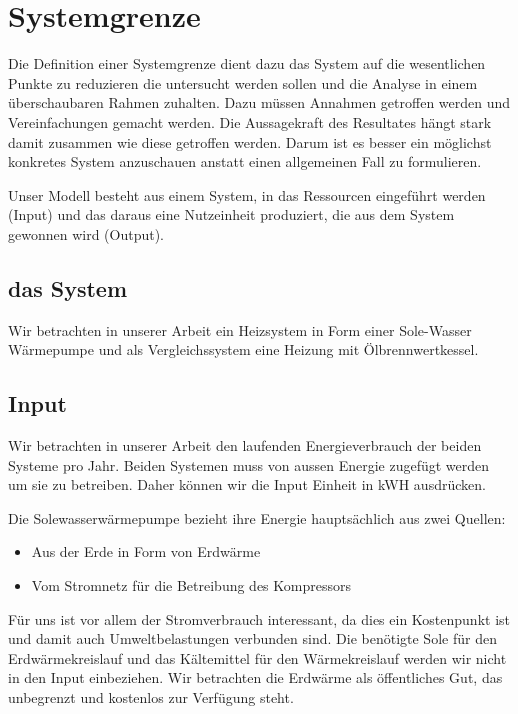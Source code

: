 \chapter{Systemgrenze}
\label{chap:Systemgrenze}

Die Definition einer Systemgrenze dient dazu das System auf die wesentlichen
Punkte zu reduzieren die untersucht werden sollen und die Analyse in einem
überschaubaren Rahmen zuhalten.
Dazu müssen Annahmen getroffen werden und Vereinfachungen gemacht werden.
Die Aussagekraft des Resultates hängt stark damit zusammen wie diese getroffen
werden. Darum ist es besser ein möglichst konkretes System anzuschauen anstatt
einen allgemeinen Fall zu formulieren.

Unser Modell besteht aus einem System, in das Ressourcen eingeführt werden
(Input) und das daraus eine Nutzeinheit produziert, die aus dem System gewonnen
wird (Output).

\section{das System}

Wir betrachten in unserer Arbeit ein Heizsystem in Form einer
Sole-Wasser Wärmepumpe und als Vergleichssystem eine Heizung mit
Ölbrennwertkessel.

\section{Input}

Wir betrachten in unserer Arbeit den laufenden Energieverbrauch der beiden
Systeme pro Jahr.
Beiden Systemen muss von aussen Energie zugefügt werden um sie zu betreiben.
Daher können wir die Input Einheit in kWH ausdrücken.

Die Solewasserwärmepumpe bezieht ihre Energie hauptsächlich aus zwei Quellen:
\begin{itemize}
\item Aus der Erde in Form von Erdwärme
\item Vom Stromnetz für die Betreibung des Kompressors
\end{itemize}

Für uns ist vor allem der Stromverbrauch interessant, da dies ein Kostenpunkt
ist und damit auch Umweltbelastungen verbunden sind. Die benötigte Sole für den Erdwärmekreislauf und das Kältemittel für den Wärmekreislauf werden wir nicht in den Input einbeziehen. Wir betrachten die Erdwärme als öffentliches Gut, das unbegrenzt und kostenlos zur Verfügung steht.

